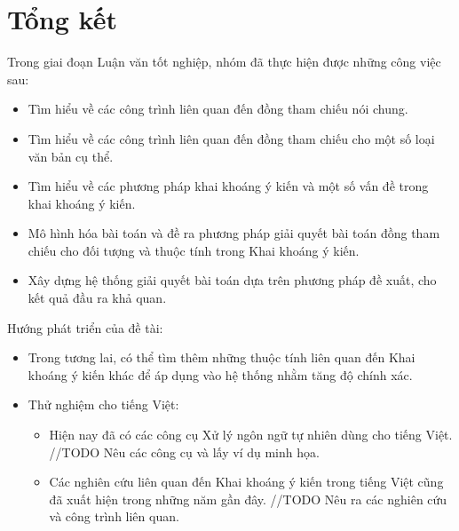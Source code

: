 \documentclass[12pt]{extarticle}
\begin{document}
	\section{Tổng kết}		
		\par Trong giai đoạn Luận văn tốt nghiệp, nhóm đã thực hiện được những công việc sau:
		\begin{itemize}
			\item{Tìm hiểu về các công trình liên quan đến đồng tham chiếu nói chung.}
			\item{Tìm hiểu về các công trình liên quan đến đồng tham chiếu cho một số loại văn bản cụ thể.}
			\item{Tìm hiểu về các phương pháp khai khoáng ý kiến và một số vấn đề trong khai khoáng ý kiến.}
			\item{Mô hình hóa bài toán và đề ra phương pháp giải quyết bài toán đồng tham chiếu cho đối tượng và thuộc tính trong Khai khoáng ý kiến.}
			\item{Xây dựng hệ thống giải quyết bài toán dựa trên phương pháp đề xuất, cho kết quả đầu ra khả quan.}
		\end{itemize}		
		\par Hướng phát triển của đề tài:
		\begin{itemize}
			\item{Trong tương lai, có thể tìm thêm những thuộc tính liên quan đến Khai khoáng ý kiến khác để áp dụng vào hệ thống nhằm tăng độ chính xác.}
			\item{Thử nghiệm cho tiếng Việt:
				\begin{itemize}
					\item{Hiện nay đã có các công cụ Xử lý ngôn ngữ tự nhiên dùng cho tiếng Việt. //TODO Nêu các công cụ và lấy ví dụ minh họa.}
					\item{Các nghiên cứu liên quan đến Khai khoáng ý kiến trong tiếng Việt cũng đã xuất hiện trong những năm gần đây. //TODO Nêu ra các nghiên cứu và công trình liên quan.}
				\end{itemize}
			}
		\end{itemize}

\renewcommand{\refname}{Tham khảo} 
\end{document}
